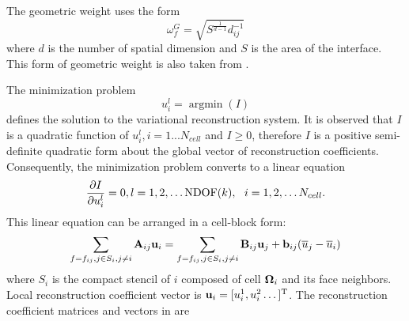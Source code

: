 \documentclass[preprint,12pt]{elsarticle}
\begin{document}
The geometric weight uses the form
\begin{equation}
    \omega_f^G = \sqrt{S^{\frac{1}{d-1}}d_{ij}^{-1}}
\end{equation}
where $d$ is the number of spatial dimension and $S$ is the area of the interface. 
This form of
geometric weight is also taken from \cite{huang2022high}.

The minimization problem
\begin{equation}
    u_i^l = \mathop{\arg \min}(I)
\end{equation}
defines the solution to the variational reconstruction system.
It is observed that $I$ is a quadratic function of $u_i^l, i = 1...N_{cell}$ and
$I\geq 0$,
therefore $I$ is a positive semi-definite quadratic form about the global vector of reconstruction
coefficients. Consequently, the minimization problem converts to a linear equation
\begin{equation}
    \partialderivative{I}{u_i^l} = 0, l=1,2,\dots \mathrm{NDOF}(k),\ \ i=1,2,\dots N_{cell} .
\end{equation}
This linear equation can be arranged in a cell-block form:
\begin{equation}
    \label{eq:vrBlockEq}
    \sum_{f=f_{ij},j\in S_i, j\neq i}{ \mathbf{A}_{ij} \mathbf{u}_i}
    =
    \sum_{f=f_{ij},j\in S_i, j\neq i}{ \mathbf{B}_{ij} \mathbf{u}_j + \mathbf{b}_{ij} (\overline{u}_j - \overline{u}_i)}
\end{equation}
where $S_i$ is the compact stencil of $i$ composed of cell $\mathbf{\Omega}_{i}$ and its face neighbors.
Local reconstruction coefficient vector is $\mathbf{u}_i = [u_i^1,u_i^2\dots]^\mathrm{T}$. 
The reconstruction coefficient matrices and vectors in  
are
\end{document}

